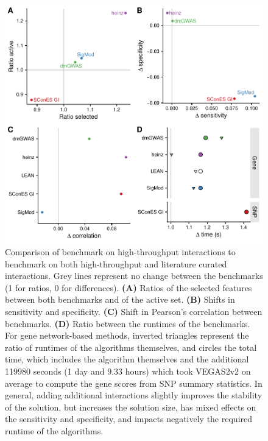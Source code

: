 \documentclass[twocolumn, 10pt]{article}
\begin{document}
\begin{figure}[htbp]
\centering
\includegraphics[width=.9\linewidth]{./figures/sfigure_10.pdf}
\caption{\label{sfig:lc_ht_comparison}
Comparison of benchmark on high-throughput interactions to benchmark on both high-throughput and literature curated interactions. Grey lines represent no change between the benchmarks (1 for ratios, 0 for differences). \textbf{(A)} Ratios of the selected features between both benchmarks and of the active set. \textbf{(B)} Shifts in sensitivity and specificity. \textbf{(C)} Shift in Pearson's correlation between benchmarks. \textbf{(D)} Ratio between the runtimes of the benchmarks. For gene network-based methods, inverted triangles represent the ratio of runtimes of the algorithms themselves, and circles the total time, which includes the algorithm themselves and the additional 119980 seconds (1 day and 9.33 hours) which took VEGAS2v2 on average to compute the gene scores from SNP summary statistics. In general, adding additional interactions slightly improves the stability of the solution, but increases the solution size, has mixed effects on the sensitivity and specificity, and impacts negatively the required runtime of the algorithms.}
\end{figure}
\end{document}
